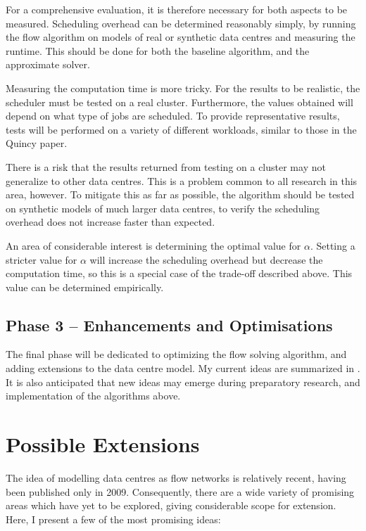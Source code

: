 For a comprehensive evaluation, it is therefore necessary for both aspects to be measured. Scheduling overhead can be determined reasonably simply, by running the flow algorithm on models of real or synthetic data centres and measuring the runtime. This should be done for both the baseline algorithm, and the approximate solver.

Measuring the computation time is more tricky. For the results to be realistic, the scheduler must be tested on a real cluster. Furthermore, the values obtained will depend on what type of jobs are scheduled. To provide representative results, tests will be performed on a variety of different workloads, similar to those in the Quincy paper\cite{Isard:2009}.

There is a risk that the results returned from testing on a cluster may not generalize to other data centres. This is a problem common to all research in this area, however. To mitigate this as far as possible, the algorithm should be tested on synthetic models of much larger data centres, to verify the scheduling overhead does not increase faster than expected.

An area of considerable interest is determining the optimal value for $\alpha$. Setting a stricter value for $\alpha$ will increase the scheduling overhead but decrease the computation time, so this is a special case of the trade-off described above. This value can be determined empirically.

\subsection*{Phase 3 -- Enhancements and Optimisations}

The final phase will be dedicated to optimizing the flow solving algorithm, and adding extensions to the data centre model. My current ideas are summarized in . It is also anticipated that new ideas may emerge during preparatory research, and implementation of the algorithms above.

\section*{Possible Extensions}
\label{sec:extensions}

The idea of modelling data centres as flow networks is relatively recent, having been published only in 2009. Consequently, there are a wide variety of promising areas which have yet to be explored, giving considerable scope for extension. Here, I present a few of the most promising ideas:

